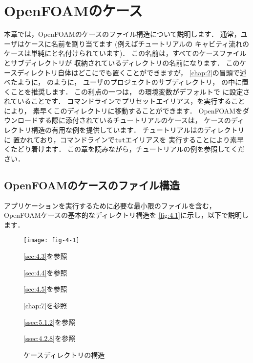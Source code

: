 \chapter{OpenFOAMのケース}
\label{chap:4}
%
%
本章では，OpenFOAMのケースのファイル構造について説明します．
通常，ユーザはケースに名前を割り当てます (例えばチュートリアルの
キャビティ流れのケースは単純にと名付けられています)．
この名前は，すべてのケースファイルとサブディレクトリが
収納されているディレクトリの名前になります．
このケースディレクトリ自体はどこにでも置くことができますが，
\autoref{chap:2}の冒頭で述べたように，
のように，
ユーザのプロジェクトのサブディレクトリ，
%
%
の中に置くことを推奨します．
この利点の一つは，
%
%
の環境変数がデフォルトで
に設定されていることです．
コマンドラインでプリセットエイリアス，を実行することにより，
素早くこのディレクトリに移動することができます．
OpenFOAMをダウンロードする際に添付されているチュートリアルのケースは，
ケースのディレクトリ構造の有用な例を提供しています．
チュートリアルはのディレクトリに
置かれており，コマンドラインで\texttt{tut}エイリアスを
実行することにより素早くたどり着けます．
この章を読みながら，チュートリアルの例を参照してください．



\section{OpenFOAMのケースのファイル構造}
\label{sec:4.1}
アプリケーションを実行するために必要な最小限のファイルを含む，
OpenFOAMケースの基本的なディレクトリ構造を
\autoref{fig:4.1}に示し，以下で説明します．


\begin{figure}[ht]
 \begin{minipage}{.6\textwidth}
  \texttt{[image: fig-4-1]}
  \hskip5pt
  \begin{minipage}[b]{7zw}
   \def\baselinestretch{1.2}\selectfont
   \autoref{sec:4.3}を参照\par
   \autoref{sec:4.4}を参照\par
   \autoref{sec:4.5}を参照\par
   \vskip28pt
   \autoref{chap:7}を参照\par
   \vskip4pt
   \autoref{ssec:5.1.2}を参照\par
   \vskip68pt
   \autoref{ssec:4.2.8}を参照\par
   \vskip-12pt\null
  \end{minipage}
 \end{minipage}
 \caption{ケースディレクトリの構造}
 \label{fig:4.1}
\end{figure}


